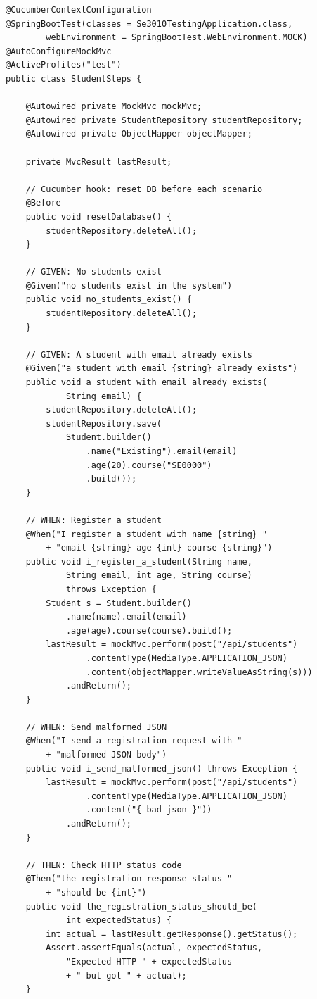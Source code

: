 \documentclass[12pt,a4paper]{article}
\begin{document}
\begin{lstlisting}[style=javastyle, caption={\texttt{StudentSteps.java} -- Cucumber step definitions}]
@CucumberContextConfiguration
@SpringBootTest(classes = Se3010TestingApplication.class,
        webEnvironment = SpringBootTest.WebEnvironment.MOCK)
@AutoConfigureMockMvc
@ActiveProfiles("test")
public class StudentSteps {

    @Autowired private MockMvc mockMvc;
    @Autowired private StudentRepository studentRepository;
    @Autowired private ObjectMapper objectMapper;

    private MvcResult lastResult;

    // Cucumber hook: reset DB before each scenario
    @Before
    public void resetDatabase() {
        studentRepository.deleteAll();
    }

    // GIVEN: No students exist
    @Given("no students exist in the system")
    public void no_students_exist() {
        studentRepository.deleteAll();
    }

    // GIVEN: A student with email already exists
    @Given("a student with email {string} already exists")
    public void a_student_with_email_already_exists(
            String email) {
        studentRepository.deleteAll();
        studentRepository.save(
            Student.builder()
                .name("Existing").email(email)
                .age(20).course("SE0000")
                .build());
    }

    // WHEN: Register a student
    @When("I register a student with name {string} "
        + "email {string} age {int} course {string}")
    public void i_register_a_student(String name,
            String email, int age, String course)
            throws Exception {
        Student s = Student.builder()
            .name(name).email(email)
            .age(age).course(course).build();
        lastResult = mockMvc.perform(post("/api/students")
                .contentType(MediaType.APPLICATION_JSON)
                .content(objectMapper.writeValueAsString(s)))
            .andReturn();
    }

    // WHEN: Send malformed JSON
    @When("I send a registration request with "
        + "malformed JSON body")
    public void i_send_malformed_json() throws Exception {
        lastResult = mockMvc.perform(post("/api/students")
                .contentType(MediaType.APPLICATION_JSON)
                .content("{ bad json }"))
            .andReturn();
    }

    // THEN: Check HTTP status code
    @Then("the registration response status "
        + "should be {int}")
    public void the_registration_status_should_be(
            int expectedStatus) {
        int actual = lastResult.getResponse().getStatus();
        Assert.assertEquals(actual, expectedStatus,
            "Expected HTTP " + expectedStatus
            + " but got " + actual);
    }


\end{lstlisting}
\end{document}
